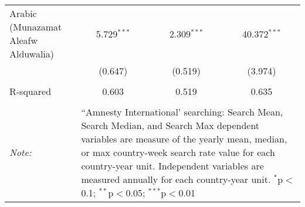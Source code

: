 \begin{table}[!htbp]
\begin{tabular}{@{\extracolsep{5pt}}lccc}
  Arabic (Munazamat Aleafw Alduwalia) & 5.729$^{***}$ & 2.309$^{***}$ & 40.372$^{***}$ \\ 
  & (0.647) & (0.519) & (3.974) \\ 
 \hline \\[-1.8ex] 
R-squared  & 0.603 & 0.519 & 0.635 \\ 
\hline 
\hline \\[-1.8ex] 
\textit{Note:}  & \multicolumn{3}{l}{\parbox[t]{8cm}{``Amnesty International' searching: Search Mean, Search Median, and Search Max dependent variables are measure of the yearly mean, median, or max country-week search rate value for each country-year unit. Independent variables are measured annually for each country-year unit. $^{*}$p$<$0.1; $^{**}$p$<$0.05; $^{***}$p$<$0.01}} \\ 
\end{tabular} 
\end{table} 
